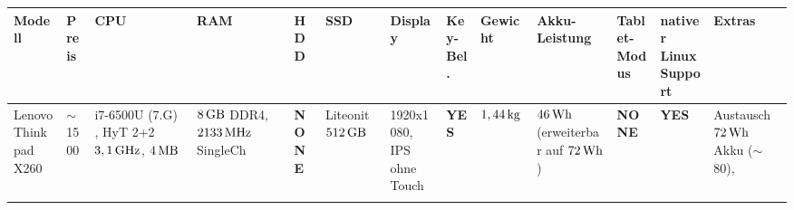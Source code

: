 \documentclass[numbers=noenddot,a4paper]{scrartcl}
\newcommand{\fett}[1]{\textbf{#1}}  %
\begin{document}
	\newpage
	
	\thispagestyle{empty}
	
		\begin{landscape}
			
			\begin{center}
				
				\begin{table}[h]
					
					\begin{tabular}{m{1.25cm}|m{1cm}|m{1.75cm}|m{1.5cm}|m{1.5cm}|m{1.5cm}|m{2.5cm}|m{1cm}|m{1.5cm}|m{1.5cm}|m{1cm}|m{3cm}|m{3cm}}
						
						Modell & Preis & CPU & RAM & HDD & SSD & Display & Key-Bel. & Gewicht & Akku-Leistung & Tablet-Modus & nativer Linux Support & Extras \\ \hline\hline
						
						Lenovo Thinkpad X260 & $\sim$1500\texteuro & i7-6500U (7.G) , HyT 2+2 $\unit[3,1]{GHz}$, $\unit[4]{MB}$ & $\unit[8]{GB}$ DDR4, $\unit[2133]{MHz}$ SingleCh & \fett{NONE} & Liteonit $\unit[512]{GB}$ & 1920x1080, IPS ohne Touch & \fett{YES} & $\unit[1,44]{kg}$ & $\unit[46]{Wh}$ (erweiterbar auf $\unit[72]{Wh}$) & \fett{NONE} & \fett{YES} & Austausch $\unit[72]{Wh}$ Akku ($\sim$80\texteuro),\\ \hline
						
						& & & & & & & & & & & & \\ 
						
						
					\end{tabular}
					
				\end{table}
				
			\end{center}
			
		\end{landscape}
	
\end{document}
